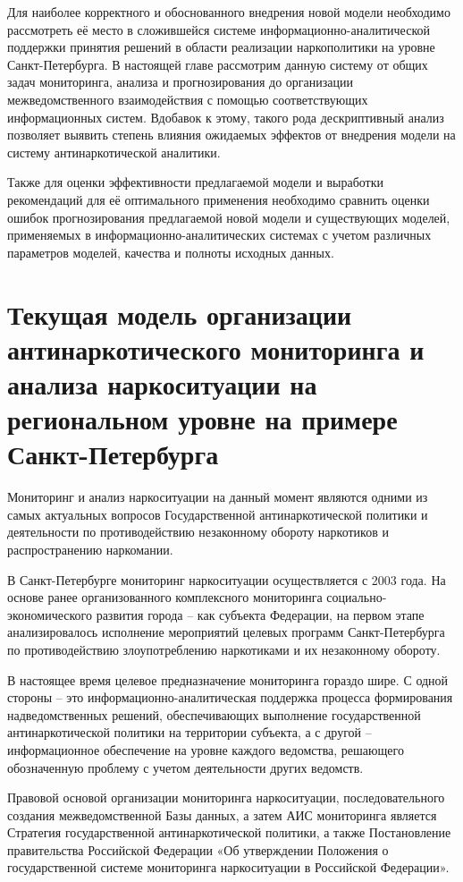 Для наиболее корректного и обоснованного внедрения новой модели необходимо
рассмотреть её место в сложившейся системе информационно-аналитической поддержки
принятия решений  в области реализации наркополитики на уровне Санкт-Петербурга.
В настоящей главе рассмотрим данную систему от общих задач мониторинга, анализа
и прогнозирования до организации межведомственного взаимодействия с помощью
соответствующих информационных систем.  Вдобавок к этому, такого рода
дескриптивный анализ позволяет выявить степень  влияния ожидаемых эффектов от
внедрения модели на систему антинаркотической аналитики.

Также для оценки эффективности предлагаемой модели и выработки рекомендаций для
её оптимального применения необходимо сравнить оценки ошибок прогнозирования
предлагаемой новой модели и существующих моделей, применяемых в
информационно-аналитических системах с учетом различных параметров моделей,
качества и полноты исходных данных.

\section{Текущая модель организации антинаркотического мониторинга и анализа
наркоситуации на региональном уровне на примере Санкт-Петербурга}

Мониторинг и анализ наркоситуации на данный момент являются одними из самых
актуальных вопросов Государственной антинаркотической политики и деятельности по
противодействию незаконному обороту наркотиков и распространению наркомании. 

В Санкт-Петербурге мониторинг наркоситуации осуществляется с 2003 года. На
основе ранее организованного комплексного мониторинга социально-экономического
развития города – как субъекта Федерации, на первом этапе  анализировалось
исполнение мероприятий целевых программ Санкт-Петербурга по противодействию
злоупотреблению наркотиками и их незаконному обороту.

В настоящее время целевое предназначение мониторинга гораздо шире. С одной
стороны – это информационно-аналитическая поддержка процесса формирования
надведомственных решений, обеспечивающих выполнение государственной
антинаркотической политики на территории субъекта, а с другой – информационное
обеспечение на уровне каждого ведомства, решающего обозначенную проблему с
учетом деятельности других ведомств.

Правовой основой организации мониторинга наркоситуации, последовательного
создания межведомственной Базы данных, а затем АИС мониторинга является
Стратегия государственной антинаркотической политики, а также Постановление
правительства Российской Федерации «Об утверждении Положения о государственной
системе мониторинга наркоситуации в Российской Федерации».

